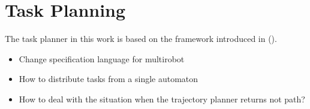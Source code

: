 \section{Task Planning}
The task planner in this work is based on the framework introduced in ().
\begin{itemize}
\item Change specification language for multirobot
\item How to distribute tasks from a single automaton
\item How to deal with the situation when the trajectory planner returns not path?
\end{itemize}